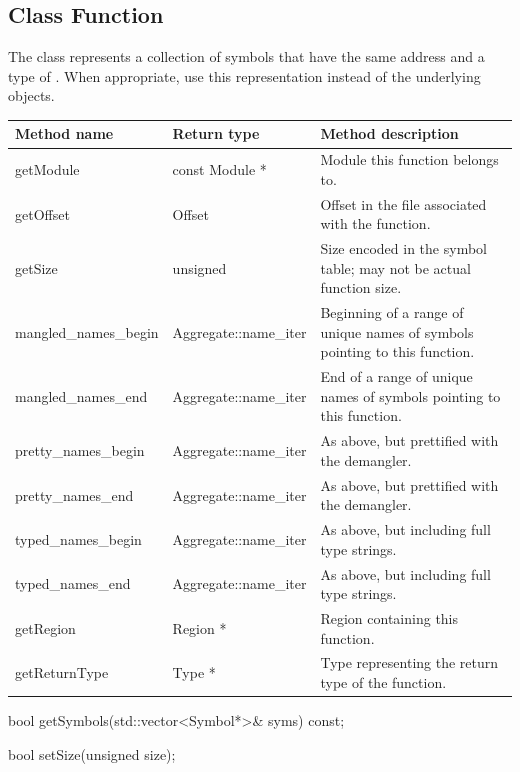 \subsection{Class Function}
\label{Function}


The  class represents a collection of symbols that have the same address
and a type of . When appropriate, use this representation instead of the underlying  objects.

\begin{tabularx}{\textwidth}{llX}
\toprule
Method name & Return type & Method description \\
\midrule
getModule & const Module * & Module this function belongs to. \\
getOffset & Offset & Offset in the file associated with the function. \\
getSize & unsigned & Size encoded in the symbol table; may not be actual function size. \\
mangled\_names\_begin & Aggregate::name\_iter & Beginning of a range of unique names of symbols pointing to this function. \\
mangled\_names\_end & Aggregate::name\_iter & End of a range of unique names of symbols pointing to this function. \\
pretty\_names\_begin &  Aggregate::name\_iter & As above, but prettified with the demangler. \\
pretty\_names\_end &  Aggregate::name\_iter & As above, but prettified with the demangler. \\
typed\_names\_begin & Aggregate::name\_iter  & As above, but including full type strings. \\
typed\_names\_end & Aggregate::name\_iter  & As above, but including full type strings. \\
getRegion & Region * & Region containing this function. \\
getReturnType & Type * & Type representing the return type of the function. \\
\bottomrule
\end{tabularx}

\begin{apient}
bool getSymbols(std::vector<Symbol*>& syms) const;
\end{apient}


\begin{apient}
bool setSize(unsigned size);
\end{apient}

